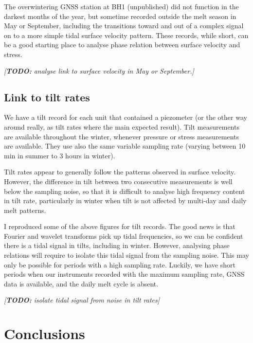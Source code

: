 \documentclass[utf8]{article}
\newcommand{\todo}[1]{\textcolor{c3}{\emph{[\textbf{TODO:} #1]}}}
\begin{document}
    The overwintering GNSS station at BH1 (unpublished) did not function in the
    darkest months of the year, but sometime recorded outside the melt season
    in May or September, including the transitions toward and out of a complex
    signal on to a more simple tidal surface velocity pattern. These records,
    while short, can be a good starting place to analyse phase relation between
    surface velocity and stress.

    \todo{analyse link to surface velocity in May or September.}

\subsection{Link to tilt rates}

    We have a tilt record for each unit that contained a piezometer (or the
    other way around really, as tilt rates where the main expected result).
    Tilt measurements are available throughout the winter, whenever pressure
    or stress measurements are available. They use also the same variable
    sampling rate (varying between 10 min in summer to 3 hours in winter).

    Tilt rates appear to generally follow the patterns observed in surface
    velocity. However, the difference in tilt between two consecutive
    measurements is well below the sampling noise, so that it is difficult to
    analyse high frequency content in tilt rate, particularly in winter when
    tilt is not affected by multi-day and daily melt patterns.

    I reproduced some of the above figures for tilt records. The good news is
    that Fourier and wavelet transforms pick up tidal frequencies, so we can
    be confident there is a tidal signal in tilts, including in winter.
    However, analysing phase relations will require to isolate this tidal
    signal from the sampling noise. This may only be possible for periods with
    a high sampling rate. Luckily, we have short periods when our instruments
    recorded with the maximum sampling rate, GNSS data is available, and the
    daily melt cycle is absent.

    \todo{isolate tidal signal from noise in tilt rates}

\section{Conclusions}
\end{document}
